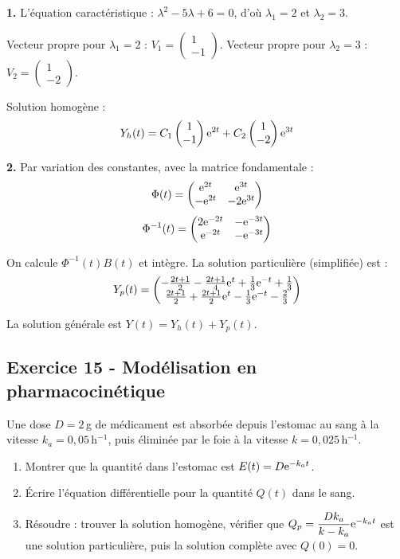 \documentclass[12pt,a4paper]{article}
\begin{document}
\begin{boitecorrige}
\textbf{1.} L'équation caractéristique : $\lambda^2-5\lambda+6=0$, d'où $\lambda_1=2$ et $\lambda_2=3$.

Vecteur propre pour $\lambda_1=2$ : $V_1=\begin{pmatrix}1\\-1\end{pmatrix}$.
Vecteur propre pour $\lambda_2=3$ : $V_2=\begin{pmatrix}1\\-2\end{pmatrix}$.

Solution homogène :
\[
Y_h(t) = C_1\begin{pmatrix}1\\-1\end{pmatrix}\mathrm{e}^{2t} + C_2\begin{pmatrix}1\\-2\end{pmatrix}\mathrm{e}^{3t}
\]

\textbf{2.} Par variation des constantes, avec la matrice fondamentale :
\[
\Phi(t) = \begin{pmatrix}\mathrm{e}^{2t}&\mathrm{e}^{3t}\\-\mathrm{e}^{2t}&-2\mathrm{e}^{3t}\end{pmatrix}
\]
\[
\Phi^{-1}(t) = \begin{pmatrix}2\mathrm{e}^{-2t}&-\mathrm{e}^{-3t}\\\mathrm{e}^{-2t}&-\mathrm{e}^{-3t}\end{pmatrix}
\]

On calcule $\Phi^{-1}(t)B(t)$ et intègre. La solution particulière (simplifiée) est :
\[
Y_p(t) = \begin{pmatrix}-\frac{2t+1}{2}-\frac{2t+1}{4}\mathrm{e}^t+\frac{1}{3}\mathrm{e}^{-t}+\frac{1}{3}\\\frac{2t+1}{2}+\frac{2t+1}{2}\mathrm{e}^t-\frac{1}{3}\mathrm{e}^{-t}-\frac{2}{3}\end{pmatrix}
\]

La solution générale est $Y(t) = Y_h(t) + Y_p(t)$.
\end{boitecorrige}

\subsection*{Exercice 15 - Modélisation en pharmacocinétique \niveau{\moyen}}

\begin{boiteexercice}
Une dose $D=2$\,g de médicament est absorbée depuis l'estomac au sang à la vitesse $k_a=0{,}05$\,h$^{-1}$, puis éliminée par le foie à la vitesse $k=0{,}025$\,h$^{-1}$.
\begin{enumerate}
  \item Montrer que la quantité dans l'estomac est $E(t) = D\mathrm{e}^{-k_a t}$.
  \item Écrire l'équation différentielle pour la quantité $Q(t)$ dans le sang.
  \item Résoudre : trouver la solution homogène, vérifier que $Q_p = \dfrac{Dk_a}{k-k_a}\mathrm{e}^{-k_a t}$ est une solution particulière, puis la solution complète avec $Q(0)=0$.
\end{enumerate}
\end{boiteexercice}
\end{document}
